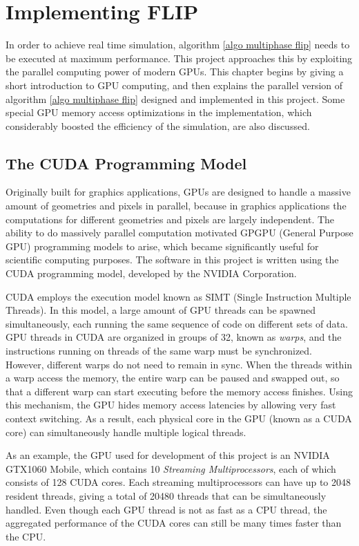 


\chapter{Implementing FLIP}
\label{chapter flip impl}

In order to achieve real time simulation, algorithm \ref{algo multiphase flip} needs to be executed at maximum performance. This project approaches this by exploiting the parallel computing power of modern GPUs. This chapter begins by giving a short introduction to GPU computing, and then explains the parallel version of algorithm \ref{algo multiphase flip} designed and implemented in this project. Some special GPU memory access optimizations in the implementation, which considerably boosted the efficiency of the simulation, are also discussed. 

\section{The CUDA Programming Model}

Originally built for graphics applications, GPUs are designed to handle a massive amount of geometries and pixels in parallel, because in graphics applications the computations for different geometries and pixels are largely independent. The ability to do massively parallel computation motivated GPGPU (General Purpose GPU) programming models to arise, which became significantly useful for scientific computing purposes. The software in this project is written using the CUDA programming model, developed by the NVIDIA Corporation.

CUDA employs the execution model known as SIMT (Single Instruction Multiple Threads). In this model, a large amount of GPU threads can be spawned simultaneously, each running the same sequence of code on different sets of data. GPU threads in CUDA are organized in groups of 32, known as \textit{warps}, and the instructions running on threads of the same warp must be synchronized. However, different warps do not need to remain in sync. When the threads within a warp access the memory, the entire warp can be paused and swapped out, so that a different warp can start executing before the memory access finishes. Using this mechanism, the GPU hides memory access latencies by allowing very fast context switching. As a result, each physical core in the GPU (known as a CUDA core) can simultaneously handle multiple logical threads.

As an example, the GPU used for development of this project is an NVIDIA GTX1060 Mobile, which contains 10 \textit{Streaming Multiprocessors}, each of which consists of 128 CUDA cores. Each streaming multiprocessors can have up to 2048 resident threads, giving a total of 20480 threads that can be simultaneously handled. Even though each GPU thread is not as fast as a CPU thread, the aggregated performance of the CUDA cores can still be many times faster than the CPU.


